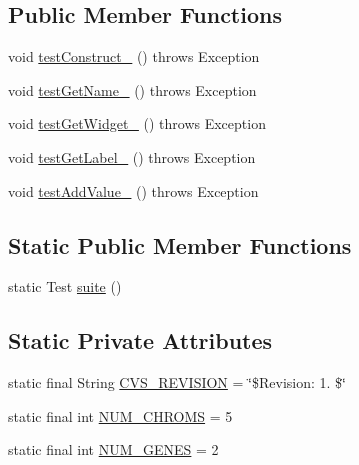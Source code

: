 \subsection*{Public Member Functions}
\begin{DoxyCompactItemize}
\item 
void \hyperlink{classorg_1_1jgap_1_1data_1_1config_1_1_config_property_test_a09e454d6b2ec041249425ca8afa36a86}{test\-Construct\-\_} ()  throws Exception 
\item 
void \hyperlink{classorg_1_1jgap_1_1data_1_1config_1_1_config_property_test_ae6968cb02737ea531c0fd02a9986bd40}{test\-Get\-Name\-\_} ()  throws Exception 
\item 
void \hyperlink{classorg_1_1jgap_1_1data_1_1config_1_1_config_property_test_a2f048cd61803473dd741d09d33995ec1}{test\-Get\-Widget\-\_} ()  throws Exception 
\item 
void \hyperlink{classorg_1_1jgap_1_1data_1_1config_1_1_config_property_test_a041a4a60f994f7f12afb733d94d7caea}{test\-Get\-Label\-\_} ()  throws Exception 
\item 
void \hyperlink{classorg_1_1jgap_1_1data_1_1config_1_1_config_property_test_ac48f79b6c662eba6cd73b06efa659c8d}{test\-Add\-Value\-\_} ()  throws Exception 
\end{DoxyCompactItemize}
\subsection*{Static Public Member Functions}
\begin{DoxyCompactItemize}
\item 
static Test \hyperlink{classorg_1_1jgap_1_1data_1_1config_1_1_config_property_test_a2966dd750ea4f788bc31ce904c9113f8}{suite} ()
\end{DoxyCompactItemize}
\subsection*{Static Private Attributes}
\begin{DoxyCompactItemize}
\item 
static final String \hyperlink{classorg_1_1jgap_1_1data_1_1config_1_1_config_property_test_a2b72d5a16b25f3e2c089af54a17994fd}{C\-V\-S\-\_\-\-R\-E\-V\-I\-S\-I\-O\-N} = \char`\"{}\$Revision\-: 1. \$\char`\"{}
\item 
static final int \hyperlink{classorg_1_1jgap_1_1data_1_1config_1_1_config_property_test_a6b21e94d479716089d6da787f0dce1ff}{N\-U\-M\-\_\-\-C\-H\-R\-O\-M\-S} = 5
\item 
static final int \hyperlink{classorg_1_1jgap_1_1data_1_1config_1_1_config_property_test_a7cdbf0ca3237bc51342a7bc655d08dd0}{N\-U\-M\-\_\-\-G\-E\-N\-E\-S} = 2
\end{DoxyCompactItemize}
